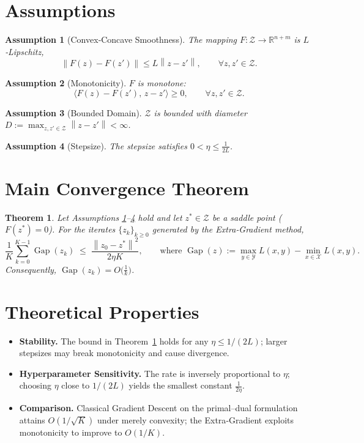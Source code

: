\documentclass{article}
\newtheorem{theorem}{Theorem}
\newtheorem{assumption}{Assumption}
\newcommand{\R}{\mathbb{R}}
\newcommand{\norm}[1]{\left\|#1\right\|}
\newcommand{\gap}{\operatorname{Gap}}
\begin{document}
\section*{Assumptions}
\begin{assumption}[Convex‑Concave Smoothness]\label{as:lip}
The mapping $F:\mathcal Z\to\R^{n+m}$ is $L$‑Lipschitz,
\[
\norm{F(z)-F(z')}\le L\norm{z-z'},\qquad\forall z,z'\in\mathcal Z .
\]
\end{assumption}
\begin{assumption}[Monotonicity]\label{as:mono}
$F$ is monotone:
\[
\langle F(z)-F(z'),\,z-z'\rangle\ge0,\qquad\forall z,z'\in\mathcal Z .
\]
\end{assumption}
\begin{assumption}[Bounded Domain]\label{as:bounded}
$\mathcal Z$ is bounded with diameter $D:=\max_{z,z'\in\mathcal Z}\norm{z-z'}<\infty$.
\end{assumption}
\begin{assumption}[Stepsize]\label{as:stepsize}
The stepsize satisfies $0<\eta\le\frac{1}{2L}$.
\end{assumption}

\section*{Main Convergence Theorem}
\begin{theorem}\label{thm:rate}
Let Assumptions \ref{as:lip}–\ref{as:stepsize} hold and let $z^{*}\in\mathcal Z$ be a saddle point
($F(z^{*})=0$).  For the iterates $\{z_{k}\}_{k\ge0}$ generated by the Extra‑Gradient method,
\[
\frac{1}{K}\sum_{k=0}^{K-1}\gap(z_{k})\;\le\;
\frac{\norm{z_{0}-z^{*}}^{2}}{2\eta K},
\qquad\text{where }\gap(z):=\max_{y\in\mathcal Y}L(x,y)-\min_{x\in\mathcal X}L(x,y).
\]
Consequently, $\gap(z_{k})=O\!\bigl(\tfrac{1}{k}\bigr)$.
\end{theorem}

\section*{Theoretical Properties}
\begin{itemize}
\item \textbf{Stability.} The bound in Theorem~\ref{thm:rate} holds for any $\eta\le1/(2L)$; larger stepsizes may break monotonicity and cause divergence.
\item \textbf{Hyperparameter Sensitivity.} The rate is inversely proportional to $\eta$; choosing $\eta$ close to $1/(2L)$ yields the smallest constant $\frac{1}{2\eta}$.
\item \textbf{Comparison.} Classical Gradient Descent on the primal–dual formulation attains $O(1/\sqrt{K})$ under merely convexity; the Extra‑Gradient exploits monotonicity to improve to $O(1/K)$.
\end{itemize}
\end{document}
